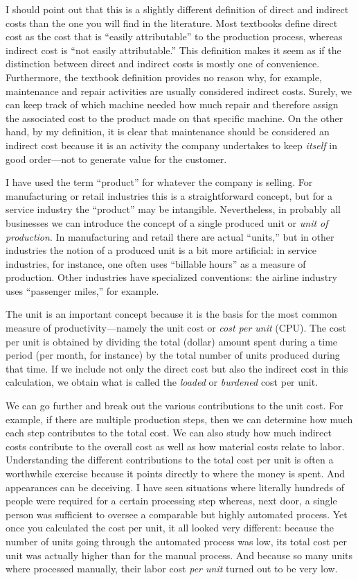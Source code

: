 I should point out that this is a slightly different definition of
direct and indirect costs than the one you will find in the
literature. Most textbooks define direct cost as the cost that is
``easily attributable'' to the production process, whereas indirect
cost is ``not easily attributable.'' This definition makes\vadjust{\pagebreak} it seem as
if the distinction between direct and indirect costs is mostly one of
convenience. Furthermore, the textbook definition provides no reason
why, for example, maintenance and repair activities are usually
considered indirect costs. Surely, we can keep track of which machine
needed how much repair and therefore assign the associated cost to the
product made on that specific machine. On the other hand, by my
definition, it is clear that maintenance should be considered an
indirect cost because it is an activity the company undertakes to keep
\emph{itself} in good order---not to generate value for the customer.

I have used the term ``product'' for whatever the company is selling.
For manufacturing or retail industries this is a straightforward
concept, but for a service industry the ``product'' may be intangible.
Nevertheless, in probably all businesses we can introduce the concept
of a single produced unit or \emph{unit of production}. In
manufacturing and retail there are actual ``units,'' but in other
industries the notion of a produced unit is a bit more artificial: in
service industries, for instance, one often uses ``billable hours'' as
a measure of production.  Other industries have specialized
conventions: the airline industry uses ``passenger miles,'' for
example.

The unit is an important concept because it is the basis for the most
common measure of productivity---namely the unit cost or \emph{cost
  per unit} (CPU).  The cost per unit is obtained by dividing the
total (dollar) amount spent during a time period (per month, for
instance) by the total number of units produced during that time. If
we include not only the direct cost but also the indirect cost in this
calculation, we obtain what is called the \emph{loaded} or
\emph{burdened} cost per unit.

We can go further and break out the various contributions to the unit
cost. For example, if there are multiple production steps, then we can
determine how much each step contributes to the total cost. We can
also study how much indirect costs contribute to the overall cost as
well as how material costs relate to labor. Understanding the
different contributions to the total cost per unit is often a
worthwhile exercise because it points directly to where the money is
spent. And appearances can be deceiving. I have seen situations where
literally hundreds of people were required for a certain processing
step whereas, next door, a single person was sufficient to oversee a
comparable but highly automated process. Yet once you calculated the
cost per unit, it all looked very different: because the number of
units going through the automated process was low, its total cost per
unit was actually higher than for the manual process. And because so
many units where processed manually, their labor cost \emph{per unit}
turned out to be very low.

